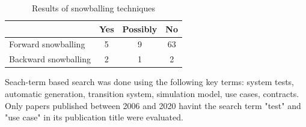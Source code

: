\begin{table}[h] 
	\centering
	\begin{small}
		\caption{Results of snowballing techniques}
		\label{snowballing}
		\setlength{\tabcolsep}{1em}
		\begin{tabular}{l|c|c|c}
			\hline
			& \textbf{Yes} & \textbf{Possibly} & \textbf{No} \\
			\hline
			\hline	
			Forward snowballing & 5 & 9 & 63 \\
			\hline
			Backward snowballing & 2 & 1 & 2 \\
			\hline
		\end{tabular}
	\end{small}
\end{table}

Seach-term based search was done using the following key terms: system tests, automatic generation, transition system, simulation model, use cases, contracts. Only papers published between 2006 and 2020 havint the search term "test" and "use case" in its publication title were evaluated. 

